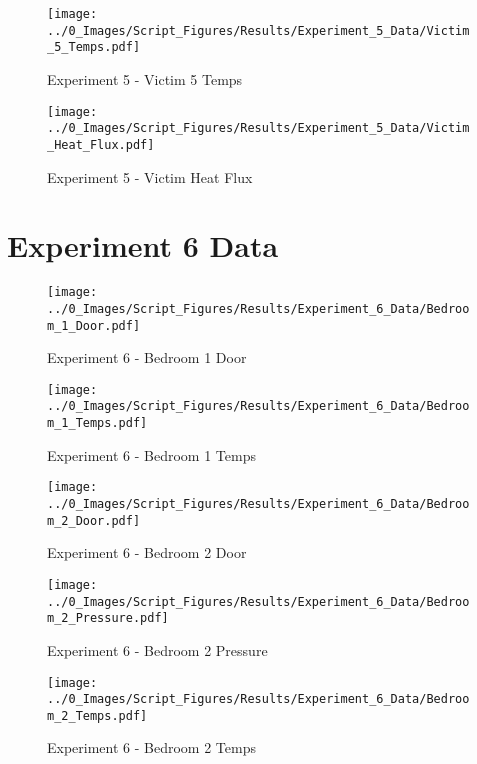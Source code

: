 	\clearpage

	\begin{figure}[H]
		\centering
		\texttt{[image: ../0\_Images/Script\_Figures/Results/Experiment\_5\_Data/Victim\_5\_Temps.pdf]}
		\caption[]{Experiment 5 - Victim 5 Temps}
	\end{figure}
 

	\begin{figure}[H]
		\centering
		\texttt{[image: ../0\_Images/Script\_Figures/Results/Experiment\_5\_Data/Victim\_Heat\_Flux.pdf]}
		\caption[]{Experiment 5 - Victim Heat Flux}
	\end{figure}
 
	\clearpage

\clearpage		\large
\section{Experiment 6 Data} \label{App:Exp6Results} 

	\begin{figure}[H]
		\centering
		\texttt{[image: ../0\_Images/Script\_Figures/Results/Experiment\_6\_Data/Bedroom\_1\_Door.pdf]}
		\caption[]{Experiment 6 - Bedroom 1 Door}
	\end{figure}
 

	\begin{figure}[H]
		\centering
		\texttt{[image: ../0\_Images/Script\_Figures/Results/Experiment\_6\_Data/Bedroom\_1\_Temps.pdf]}
		\caption[]{Experiment 6 - Bedroom 1 Temps}
	\end{figure}
 
	\clearpage

	\begin{figure}[H]
		\centering
		\texttt{[image: ../0\_Images/Script\_Figures/Results/Experiment\_6\_Data/Bedroom\_2\_Door.pdf]}
		\caption[]{Experiment 6 - Bedroom 2 Door}
	\end{figure}
 

	\begin{figure}[H]
		\centering
		\texttt{[image: ../0\_Images/Script\_Figures/Results/Experiment\_6\_Data/Bedroom\_2\_Pressure.pdf]}
		\caption[]{Experiment 6 - Bedroom 2 Pressure}
	\end{figure}
 
	\clearpage

	\begin{figure}[H]
		\centering
		\texttt{[image: ../0\_Images/Script\_Figures/Results/Experiment\_6\_Data/Bedroom\_2\_Temps.pdf]}
		\caption[]{Experiment 6 - Bedroom 2 Temps}
	\end{figure}
 

